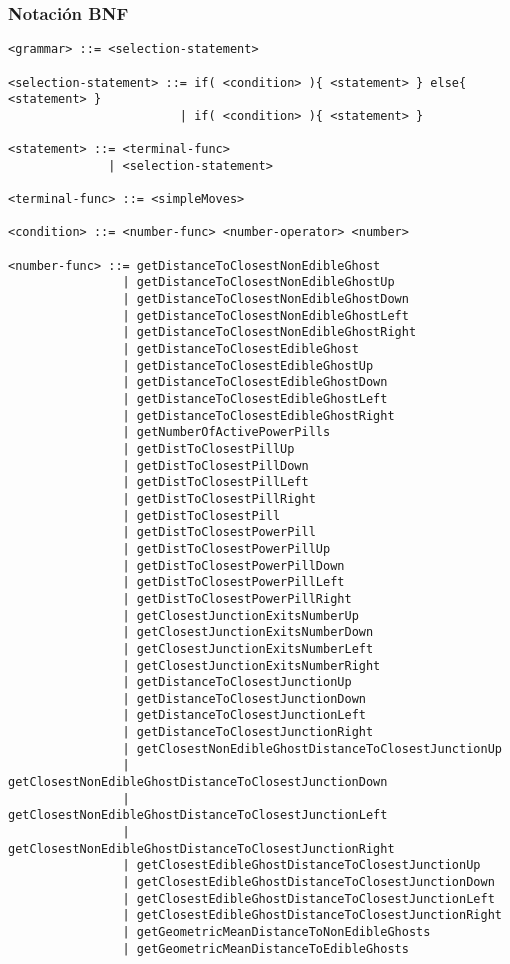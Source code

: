 \subsubsection{Notación BNF}
\begin{lstlisting}[frame=single, breaklines=no, basicstyle=\fontsize{10}{11}\ttfamily, caption={Gramática de bajo nivel.}, captionpos=b]
<grammar> ::= <selection-statement>
 
<selection-statement> ::= if( <condition> ){ <statement> } else{ <statement> }
                        | if( <condition> ){ <statement> }
 
<statement> ::= <terminal-func>
              | <selection-statement>
 
<terminal-func> ::= <simpleMoves>
 
<condition> ::= <number-func> <number-operator> <number>
 
<number-func> ::= getDistanceToClosestNonEdibleGhost
                | getDistanceToClosestNonEdibleGhostUp
                | getDistanceToClosestNonEdibleGhostDown
                | getDistanceToClosestNonEdibleGhostLeft
                | getDistanceToClosestNonEdibleGhostRight
                | getDistanceToClosestEdibleGhost
                | getDistanceToClosestEdibleGhostUp
                | getDistanceToClosestEdibleGhostDown
                | getDistanceToClosestEdibleGhostLeft
                | getDistanceToClosestEdibleGhostRight
                | getNumberOfActivePowerPills
                | getDistToClosestPillUp
                | getDistToClosestPillDown
                | getDistToClosestPillLeft
                | getDistToClosestPillRight
                | getDistToClosestPill
                | getDistToClosestPowerPill
                | getDistToClosestPowerPillUp
                | getDistToClosestPowerPillDown
                | getDistToClosestPowerPillLeft
                | getDistToClosestPowerPillRight
                | getClosestJunctionExitsNumberUp
                | getClosestJunctionExitsNumberDown
                | getClosestJunctionExitsNumberLeft
                | getClosestJunctionExitsNumberRight
                | getDistanceToClosestJunctionUp
                | getDistanceToClosestJunctionDown
                | getDistanceToClosestJunctionLeft
                | getDistanceToClosestJunctionRight
                | getClosestNonEdibleGhostDistanceToClosestJunctionUp
                | getClosestNonEdibleGhostDistanceToClosestJunctionDown
                | getClosestNonEdibleGhostDistanceToClosestJunctionLeft
                | getClosestNonEdibleGhostDistanceToClosestJunctionRight
                | getClosestEdibleGhostDistanceToClosestJunctionUp
                | getClosestEdibleGhostDistanceToClosestJunctionDown
                | getClosestEdibleGhostDistanceToClosestJunctionLeft
                | getClosestEdibleGhostDistanceToClosestJunctionRight
                | getGeometricMeanDistanceToNonEdibleGhosts
                | getGeometricMeanDistanceToEdibleGhosts
 

\end{lstlisting}
